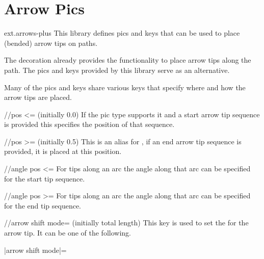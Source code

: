 %
%
%

\section{Arrow Pics}
\label{tikzlibrary:arrows}
\tikzset{external/export/.try=false}%
\begin{tikzlibrary}{ext.arrows-plus}
  This library defines pics and keys
  that can be used to place (bended) arrow tips on paths.
\end{tikzlibrary}

\begin{multicols}{2}
The  decoration
already provides the functionality to place arrow tips along the path.
The pics and keys provided by this library serve as an alternative.

Many of the pics and keys share various keys that specify
where and how the arrow tips are placed.
\begin{key}{/\tikzext/pos <= (initially 0.0)}
If the pic type supports it and a start arrow tip sequence is provided
this specifies the position of that sequence.
\end{key}
\begin{key}{/\tikzext/pos >= (initially 0.5)}
This is an alias for ,
if an end arrow tip sequence is provided, it is placed at this position.
\end{key}
\begin{key}{/\tikzext/angle pos <=}
For tips along an arc the angle along that arc can be specified for the start tip sequence.
\end{key}
\begin{key}{/\tikzext/angle pos >=}
For tips along an arc the angle along that arc can be specified for the end tip sequence.
\end{key}
\begin{key}{/\tikzext/arrow shift mode= (initially total length)}
This key is used to set the  for the arrow tip.
It can be one of the following.
\begin{description}
\item[|arrow shift mode|=]


\end{description}
\end{key}
\end{multicols}
